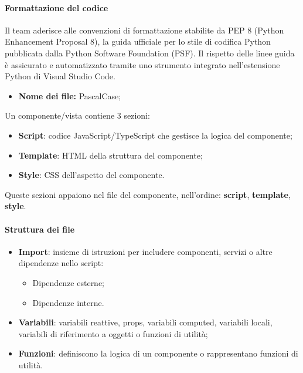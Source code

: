 \paragraph*{Formattazione del codice}
\par Il team aderisce alle convenzioni di formattazione stabilite da PEP 8 (Python Enhancement Proposal 8), la guida ufficiale per lo stile di codifica Python pubblicata dalla Python Software Foundation (PSF). Il rispetto delle linee guida è assicurato e automatizzato tramite uno strumento integrato nell'estensione Python di Visual Studio Code.

\begin{itemize}
  \item \textbf{Nome dei file:} PascalCase;
\end{itemize}
Un componente/vista contiene 3 sezioni:
\begin{itemize}
  \item \textbf{Script}: codice JavaScript/TypeScript che gestisce la logica del componente;
  \item \textbf{Template}: HTML della struttura del componente;
  \item \textbf{Style}: CSS dell'aspetto del componente.
\end{itemize}
Queste sezioni appaiono nel file del componente, nell'ordine: \textbf{script}, \textbf{template}, \textbf{style}.

\paragraph*{Struttura dei file}
\begin{itemize}
  \item \textbf{Import}: insieme di istruzioni per includere componenti, servizi o altre dipendenze nello script:
  \begin{itemize}
    \item Dipendenze esterne;
    \item Dipendenze interne.
  \end{itemize}
  \item \textbf{Variabili}: variabili reattive, props, variabili computed, variabili locali, variabili di riferimento a oggetti o funzioni di utilità;
  \item \textbf{Funzioni}: definiscono la logica di un componente o rappresentano funzioni di utilità.
\end{itemize}

